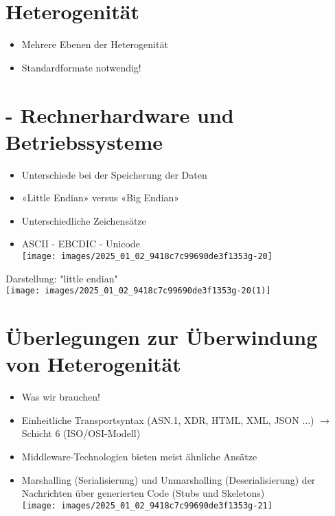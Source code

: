\documentclass[10pt]{article}
\begin{document}
\section*{Heterogenität}
\begin{itemize}
  \item Mehrere Ebenen der Heterogenität
  \item Standardformate notwendig!
\end{itemize}

\section*{- Rechnerhardware und Betriebssysteme}
\begin{itemize}
  \item Unterschiede bei der Speicherung der Daten
  \item «Little Endian» versus «Big Endian»
  \item Unterschiedliche Zeichensätze
  \item ASCII - EBCDIC - Unicode\\
\texttt{[image: images/2025\_01\_02\_9418c7c99690de3f1353g-20]}
\end{itemize}

Darstellung: "little endian"\\
\texttt{[image: images/2025\_01\_02\_9418c7c99690de3f1353g-20(1)]}

\section*{Überlegungen zur Überwindung von Heterogenität}
\begin{itemize}
  \item Was wir brauchen!
  \item Einheitliche Transportsyntax (ASN.1, XDR, HTML, XML, JSON ...) $\rightarrow$ Schicht 6 (ISO/OSI-Modell)
  \item Middleware-Technologien bieten meist ähnliche Ansätze
  \item Marshalling (Serialisierung) und Unmarshalling (Deserialisierung) der Nachrichten über generierten Code (Stubs und Skeletons)\\
\texttt{[image: images/2025\_01\_02\_9418c7c99690de3f1353g-21]}
\end{itemize}
\end{document}
